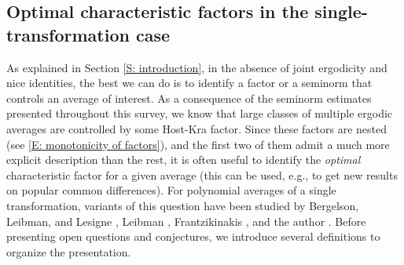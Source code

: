\documentclass[11pt]{amsart}
\theoremstyle{definition}
\newcommand{\1}{{\mathbf{1}}}
\begin{document}
\subsection{Optimal characteristic factors in the single-transformation case}
As explained in Section \ref{S: introduction}, in the absence of joint ergodicity and nice identities, the best we can do is to identify a factor or a seminorm that controls an average of interest. As a consequence of the seminorm estimates presented throughout this survey, we know that large classes of multiple ergodic averages are controlled by some Host-Kra factor. Since these factors are nested (see \eqref{E: monotonicity of factors}), and the first two of them admit a much more explicit description than the rest, it is often useful to identify the \emph{optimal} characteristic factor for a given average (this can be used, e.g., to get new results on popular common differences). For polynomial averages of a single transformation, variants of this question have been studied by Bergelson, Leibman, and Lesigne \cite{BLL07}, Leibman \cite{L09}, Frantzikinakis \cite{Fr08}, and the author \cite{Kuc22a}. Before presenting open questions and conjectures, we introduce several definitions to organize the presentation.
\end{document}

